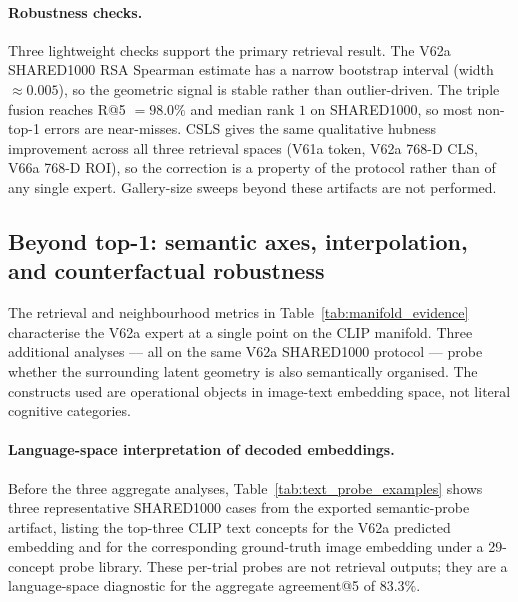 \paragraph{Robustness checks.} Three lightweight checks support the primary retrieval result. The V62a SHARED1000 RSA Spearman estimate has a narrow bootstrap interval (width $\approx 0.005$), so the geometric signal is stable rather than outlier-driven. The triple fusion reaches R@5 $= 98.0\%$ and median rank $1$ on SHARED1000, so most non-top-1 errors are near-misses. CSLS gives the same qualitative hubness improvement across all three retrieval spaces (V61a token, V62a 768-D CLS, V66a 768-D ROI), so the correction is a property of the protocol rather than of any single expert. Gallery-size sweeps beyond these artifacts are not performed.

\subsection*{Beyond top-1: semantic axes, interpolation, and counterfactual robustness}
\label{subsec:beyond_top1}

The retrieval and neighbourhood metrics in Table~\ref{tab:manifold_evidence} characterise the V62a expert at a single point on the CLIP manifold. Three additional analyses --- all on the same V62a SHARED1000 protocol --- probe whether the surrounding latent geometry is also semantically organised. The constructs used are operational objects in image-text embedding space, not literal cognitive categories.

\paragraph{Language-space interpretation of decoded embeddings.} Before the three aggregate analyses, Table~\ref{tab:text_probe_examples} shows three representative SHARED1000 cases from the exported semantic-probe artifact, listing the top-three CLIP text concepts for the V62a predicted embedding and for the corresponding ground-truth image embedding under a 29-concept probe library. These per-trial probes are not retrieval outputs; they are a language-space diagnostic for the aggregate agreement@5 of $83.3\%$.

